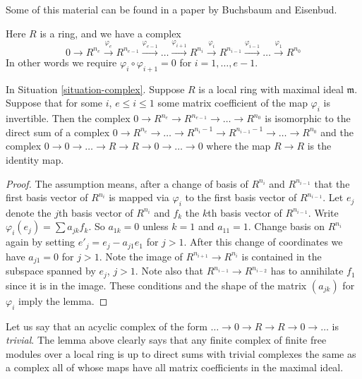 \noindent
Some of this material can be found in a paper by Buchsbaum and Eisenbud.

\begin{situation}
\label{situation-complex}
Here $R$ is a ring, and we have a complex
$$
0
\to
R^{n_e}
\xrightarrow{\varphi_e}
R^{n_{e-1}}
\xrightarrow{\varphi_{e-1}}
\ldots
\xrightarrow{\varphi_{i+1}}
R^{n_i}
\xrightarrow{\varphi_i}
R^{n_{i-1}}
\xrightarrow{\varphi_{i-1}}
\ldots
\xrightarrow{\varphi_1}
R^{n_0}
$$
In other words we require $\varphi_i \circ \varphi_{i+1} = 0$
for $i = 1, \ldots, e - 1$.
\end{situation}

\begin{lemma}
\label{lemma-add-trivial-complex}
In Situation \ref{situation-complex}.
Suppose $R$ is a local ring with maximal ideal $\mathfrak m$.
Suppose that for some $i$, $e \leq i \leq 1$
some matrix coefficient of the map $\varphi_i$ is invertible.
Then the complex $0 \to R^{n_e} \to R^{n_{e-1}} \to \ldots \to R^{n_0}$
is isomorphic to the direct sum of a complex
$0 \to R^{n_e} \to \ldots \to R^{n_i - 1} \to
R^{n_{i-1} - 1} \to \ldots \to R^{n_0}$
and the complex $0 \to 0 \to \ldots \to R \to R \to 0 \to \ldots \to 0$
where the map $R \to R$ is the identity map.
\end{lemma}

\begin{proof}
The assumption means, after a change of basis of
$R^{n_i}$ and $R^{n_{i-1}}$ that the first basis
vector of $R^{n_i}$ is mapped via $\varphi_i$ to the first basis
vector of $R^{n_{i-1}}$. Let $e_j$ denote the
$j$th basis vector of $R^{n_i}$ and $f_k$ the $k$th
basis vector of $R^{n_{i-1}}$. Write $\varphi_i(e_j) 
= \sum a_{jk} f_k$. So $a_{1k} = 0$ unless $k = 1$
and $a_{11} = 1$. Change basis on $R^{n_i}$ again
by setting $e'_j = e_j - a_{j1} e_1$ for $j > 1$.
After this change of coordinates we have $a_{j1} = 0$
for $j > 1$. Note the image
of $R^{n_{i+1}} \to R^{n_i}$ is contained in the
subspace spanned by $e_j$, $j > 1$. Note also
that $R^{n_{i-1}} \to R^{n_{i-2}}$ has to annihilate
$f_1$ since it is in the image. These conditions
and the shape of the matrix $(a_{jk})$ for $\varphi_i$
imply the lemma.
\end{proof}

\noindent
Let us say that an acyclic complex of the form
$\ldots \to 0 \to R \to R \to 0 \to \ldots $
is {\it trivial}. The lemma above clearly says that
any finite complex of finite free modules over a local ring is up to direct
sums with trivial complexes the same as a complex
all of whose maps have all matrix coefficients in 
the maximal ideal.

